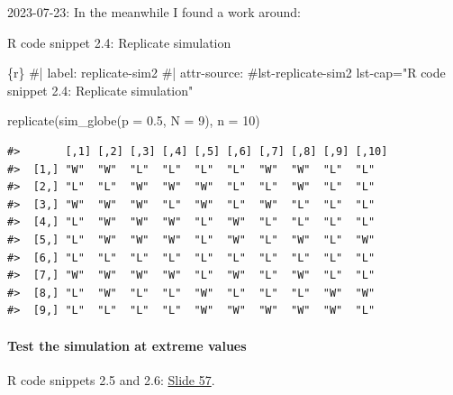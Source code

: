 \documentclass[
  letterpaper,
  DIV=11,
  numbers=noendperiod]{scrreprt}
\let\oldparagraph\paragraph
\renewcommand{\paragraph}[1]{\oldparagraph{#1}\mbox{}}
\newenvironment{Shaded}{\begin{snugshade}}{\end{snugshade}}
\newcommand{\AttributeTok}[1]{\textcolor[rgb]{0.40,0.45,0.13}{#1}}
\newcommand{\CommentTok}[1]{\textcolor[rgb]{0.37,0.37,0.37}{#1}}
\newcommand{\DecValTok}[1]{\textcolor[rgb]{0.68,0.00,0.00}{#1}}
\newcommand{\FloatTok}[1]{\textcolor[rgb]{0.68,0.00,0.00}{#1}}
\newcommand{\FunctionTok}[1]{\textcolor[rgb]{0.28,0.35,0.67}{#1}}
\newcommand{\InformationTok}[1]{\textcolor[rgb]{0.37,0.37,0.37}{#1}}
\newcommand{\NormalTok}[1]{\textcolor[rgb]{0.00,0.23,0.31}{#1}}
\begin{document}
2023-07-23: In the meanwhile I found a work around:

\begin{codelisting}

\caption{R code snippet 2.4: Replicate simulation}

\hypertarget{lst-replicate-sim2}{%
\label{lst-replicate-sim2}}%
\begin{Shaded}
\begin{Highlighting}[]
\InformationTok{\textasciigrave{}\textasciigrave{}\textasciigrave{}\{r\}}
\CommentTok{\#| label: replicate{-}sim2}
\CommentTok{\#| attr{-}source: \textquotesingle{}\#lst{-}replicate{-}sim2 lst{-}cap="R code snippet 2.4: Replicate simulation"\textquotesingle{}}

\FunctionTok{replicate}\NormalTok{(}\FunctionTok{sim\_globe}\NormalTok{(}\AttributeTok{p =} \FloatTok{0.5}\NormalTok{, }\AttributeTok{N =} \DecValTok{9}\NormalTok{), }\AttributeTok{n =} \DecValTok{10}\NormalTok{) }
\InformationTok{\textasciigrave{}\textasciigrave{}\textasciigrave{}}
\end{Highlighting}
\end{Shaded}

\end{codelisting}

\begin{verbatim}
#>       [,1] [,2] [,3] [,4] [,5] [,6] [,7] [,8] [,9] [,10]
#>  [1,] "W"  "W"  "L"  "L"  "L"  "L"  "W"  "W"  "L"  "L"  
#>  [2,] "L"  "L"  "W"  "W"  "W"  "L"  "L"  "W"  "L"  "L"  
#>  [3,] "W"  "W"  "W"  "L"  "W"  "L"  "W"  "L"  "L"  "L"  
#>  [4,] "L"  "W"  "W"  "W"  "L"  "W"  "L"  "L"  "L"  "L"  
#>  [5,] "L"  "W"  "W"  "W"  "L"  "W"  "L"  "W"  "L"  "W"  
#>  [6,] "L"  "L"  "L"  "L"  "L"  "L"  "L"  "L"  "L"  "L"  
#>  [7,] "W"  "W"  "W"  "W"  "L"  "W"  "L"  "W"  "L"  "L"  
#>  [8,] "L"  "W"  "L"  "L"  "W"  "L"  "L"  "L"  "W"  "W"  
#>  [9,] "L"  "L"  "L"  "L"  "W"  "W"  "W"  "W"  "W"  "L"
\end{verbatim}

\hypertarget{test-the-simulation-at-extreme-values}{%
\paragraph{Test the simulation at extreme
values}\label{test-the-simulation-at-extreme-values}}

R code snippets 2.5 and 2.6:
\href{https://speakerdeck.com/rmcelreath/statistical-rethinking-2023-lecture-02?slide=57}{Slide
57}.
\end{document}
